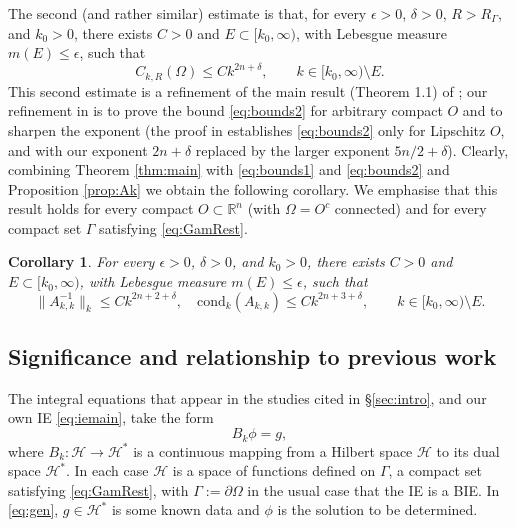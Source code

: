 \documentclass{birkjour}
\newtheorem{corollary}[theorem]{Corollary}
\theoremstyle{definition}
\theoremstyle{remark}
\numberwithin{equation}{section}
\newcommand{\eps}{\varepsilon}
\newcommand{\R}{\mathbb{R}}
\newcommand{\cH}{\mathcal{H}}
\newcommand{\cond}{\mathrm{cond}}
\begin{document}
The second (and rather similar) estimate is that, for every $\epsilon>0$, $\delta>0$, $R>R_\Gamma$, and $k_0>0$, there exists $C>0$ and $E\subset [k_0,\infty)$, with Lebesgue measure $m(E)\leq \epsilon$, such that
\begin{equation} \label{eq:bounds2}
C_{k,R}(\Omega) \leq Ck^{2n+\delta}, \qquad k\in [k_0,\infty)\setminus E.
\end{equation}
This second estimate is a refinement of the main result (Theorem 1.1) of \cite{lafontaine2021most}; our refinement in \cite{SiavashSimon1} is to prove the bound \eqref{eq:bounds2} for arbitrary compact $O$ and to sharpen the exponent (the proof in \cite{lafontaine2021most} establishes \eqref{eq:bounds2} only for Lipschitz $O$, and with our exponent $2n+\delta$ replaced by the larger exponent $5n/2+\delta$).   
Clearly, combining Theorem \ref{thm:main} with \eqref{eq:bounds1} and \eqref{eq:bounds2} and Proposition \ref{prop:Ak} we obtain the following corollary. 
We emphasise that this result holds for every compact $O\subset \R^n$ (with $\Omega=O^c$ connected) and for every compact set $\Gamma$ satisfying \eqref{eq:GamRest}.

\begin{corollary} \label{cor:gen}
For every $\epsilon>0$, $\delta>0$, and $k_0>0$, there exists $C>0$ and $E\subset [k_0,\infty)$, with Lebesgue measure $m(E)\leq \epsilon$, such that
\begin{equation} \label{eq:bounds3}
\|A_{k,k}^{-1}\|_{k}\leq Ck^{2n+2+\delta}, \quad \cond_k(A_{k,k}) \leq Ck^{2n+3+\delta},\qquad k\in [k_0,\infty)\setminus E.
\end{equation}
\end{corollary}

\subsection{Significance and relationship to previous work} \label{sec:sig}


The integral equations that appear in the studies cited in \S\ref{sec:intro}, and our own IE \eqref{eq:iemain}, take the form
\begin{equation} \label{eq:gen}
B_k \phi = g,
\end{equation}
where $B_k:\cH\to \cH^*$  is a continuous mapping from a Hilbert space $\cH$ to its dual space $\cH^*$. In each case $\cH$ is a space of functions defined on $\Gamma$, a compact set satisfying \eqref{eq:GamRest}, with $\Gamma:= \partial \Omega$ in the usual case that the IE is a BIE. In \eqref{eq:gen}, $g\in \cH^*$ is some known data and $\phi$ is the solution to be determined. 
\end{document}
